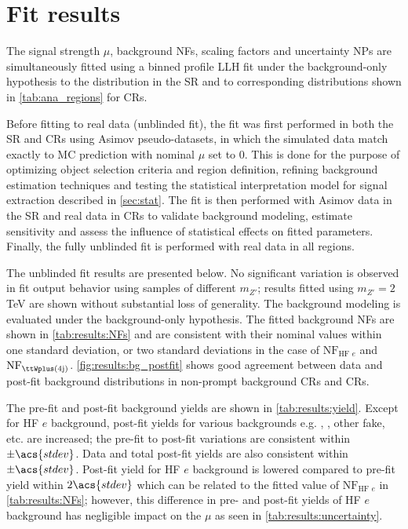 \documentclass[../thesis.tex]{subfiles}
\begin{document}
\section{Fit results}
\label{sec:results}

The signal strength $\mu$, background \acs{NF}s, \ttW scaling factors and uncertainty \acs{NP}s are simultaneously fitted using a binned profile \acs{LLH} fit under the background-only hypothesis to the \HT distribution in the \acs{SR} and to corresponding distributions shown in \autoref{tab:ana_regions} for \acs{CR}s. 

Before fitting to real data (unblinded fit), the fit was first performed in both the \acs{SR} and \acs{CR}s using Asimov pseudo-datasets, in which the simulated data match exactly to \acs{MC} prediction with nominal $\mu$ set to 0. This is done for the purpose of optimizing object selection criteria and region definition, refining background estimation techniques and testing the statistical interpretation model for signal extraction described in \autoref{sec:stat}. The fit is then performed with Asimov data in the \acs{SR} and real data in \acs{CR}s to validate background modeling, estimate sensitivity and assess the influence of statistical effects on fitted parameters. Finally, the fully unblinded fit is performed with real data in all regions.

The unblinded fit results are presented below. No significant variation is observed in fit output behavior using \ttZp samples of different $m_{Z'}$; results fitted using $m_{Z'}=2$ TeV are shown without substantial loss of generality. The background modeling is evaluated under the background-only hypothesis. The fitted background \acs{NF}s are shown in \autoref{tab:results:NFs} and are consistent with their nominal values within one standard deviation, or two standard deviations in the case of $\mathrm{NF}_{\text{HF }e}$ and $\mathrm{NF}_{\ttWplus(4\mathrm{j})}$. \autoref{fig:results:bg_postfit} shows good agreement between data and post-fit background distributions in non-prompt background \acs{CR}s and \ttW \acs{CR}s.

The pre-fit and post-fit background yields are shown in \autoref{tab:results:yield}. Except for HF $e$ background, post-fit yields for various backgrounds e.g. \tttt, \ttH, other fake, etc. are increased; the pre-fit to post-fit variations are consistent within $\pm \acs{stdev}$. Data and total post-fit yields are also consistent within $\pm \acs{stdev}$. Post-fit yield for \acs{HF} $e$ background is lowered compared to pre-fit yield within $2\acs{stdev}$ which can be related to the fitted value of $\text{NF}_{\text{HF }e}$ in \autoref{tab:results:NFs}; however, this difference in pre- and post-fit yields of HF $e$ background has negligible impact on the $\mu$ as seen in \autoref{tab:results:uncertainty}.
\end{document}
